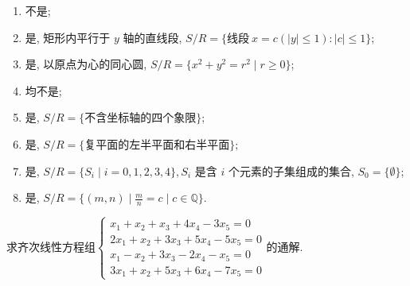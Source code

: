 \begin{exercise}
\begin{exgroup}
        \begin{answer}
            \begin{enumerate}
                \item 不是;
                \item 是, 矩形内平行于 $y$ 轴的直线段, $S/R = \{ \text{线段} \ x = c (|y| \leqslant 1) : |c| \leqslant 1 \} $;
                \item 是, 以原点为心的同心圆, $S/R = \{ x^2 + y^2 = r^2 \mid r \geqslant 0 \} $;
                \item 均不是;
                \item 是, $S/R = \{ \text{不含坐标轴的四个象限} \} $;
                \item 是, $S/R = \{ \text{复平面的左半平面和右半平面} \} $;
                \item 是, $S/R = \{ S_i \mid i = 0, 1, 2, 3, 4 \}, S_i $ 是含 $i$ 个元素的子集组成的集合, $S_0 = \{ \emptyset \}$;
                \item 是, $S/R = \{ (m,n) \mid \frac{m}{n} = c \mid c \in \mathbb{Q} \}$.
            \end{enumerate}
        \end{answer}

        \item 求齐次线性方程组$\begin{cases}
                x_1+x_2+x_3+4x_4-3x_5=0   \\
                2x_1+x_2+3x_3+5x_4-5x_5=0 \\
                x_1-x_2+3x_3-2x_4-x_5=0   \\
                3x_1+x_2+5x_3+6x_4-7x_5=0
            \end{cases}$的通解.


\end{exgroup}
\end{exercise}
